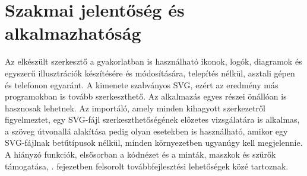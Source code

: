 \section{Szakmai jelentőség és alkalmazhatóság}
\label{sec:significance}

Az elkészült szerkesztő a gyakorlatban is használható ikonok, logók, diagramok és egyszerű illusztrációk készítésére és módosítására, telepítés nélkül, asztali gépen és telefonon egyaránt. A kimenete szabványos SVG, ezért az eredmény más programokban is tovább szerkeszthető. Az alkalmazás egyes részei önállóan is hasznosak lehetnek. Az importáló, amely minden kihagyott szerkezetről figyelmeztet, egy SVG-fájl szerkeszthetőségének előzetes vizsgálatára is alkalmas, a szöveg útvonallá alakítása pedig olyan esetekben is használható, amikor egy SVG-fájlnak betűtípusok nélkül, minden környezetben ugyanúgy kell megjelennie. A hiányzó funkciók, elsősorban a kódnézet és a minták, maszkok és szűrők támogatása, . fejezetben felsorolt továbbfejlesztési lehetőségek közé tartoznak.
